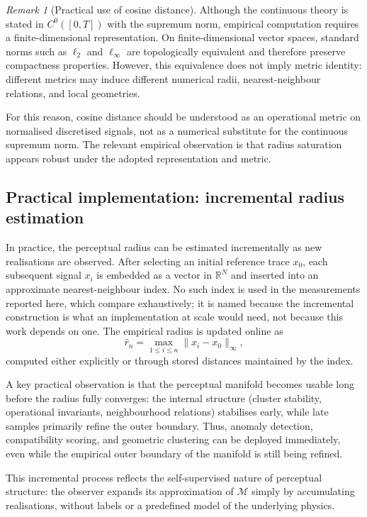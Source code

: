 \documentclass[10pt]{article}
\theoremstyle{plain}
\theoremstyle{definition}
\theoremstyle{remark}
\newtheorem{remark}[theorem]{Remark}
\begin{document}
\begin{remark}[Practical use of cosine distance]
Although the continuous theory is stated in $C^0([0,T])$ with the supremum
norm, empirical computation requires a finite-dimensional representation.
On finite-dimensional vector spaces, standard norms such as $\ell_2$ and
$\ell_\infty$ are topologically equivalent and therefore preserve compactness
properties. However, this equivalence does not imply metric identity: different
metrics may induce different numerical radii, nearest-neighbour relations, and
local geometries.

For this reason, cosine distance should be understood as an operational metric
on normalised discretised signals, not as a numerical substitute for the
continuous supremum norm. The relevant empirical observation is that radius
saturation appears robust under the adopted representation and metric.
\end{remark}

\subsection{Practical implementation: incremental radius estimation}

In practice, the perceptual radius can be estimated incrementally as new
realisations are observed. After selecting an initial reference trace $x_0$,
each subsequent signal $x_i$ is embedded as a vector in $\mathbb{R}^N$ and
inserted into an approximate nearest-neighbour index. No such index is used
in the measurements reported here, which compare exhaustively; it is named
because the incremental construction is what an implementation at scale would
need, not because this work depends on one.
The empirical radius is updated online as
\[
\hat r_n = \max_{1 \le i \le n} \|x_i - x_0\|_\infty,
\]
computed either explicitly or through stored distances maintained by the index.

A key practical observation is that the perceptual manifold becomes usable
long before the radius fully converges: the internal structure (cluster
stability, operational invariants, neighbourhood relations) stabilises early, while late
samples primarily refine the outer boundary. Thus, anomaly detection,
compatibility scoring, and geometric clustering can be deployed immediately,
even while the empirical outer boundary of the manifold is still being refined.

This incremental process reflects the self-supervised nature of perceptual
structure: the observer expands its approximation of $\mathcal{M}$ simply by
accumulating realisations, without labels or a predefined model of the
underlying physics.
\end{document}
